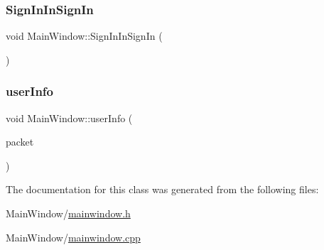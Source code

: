 \subsubsection{\texorpdfstring{Sign\+In\+In\+Sign\+In}{SignInInSignIn}}
{\footnotesize\ttfamily void Main\+Window\+::\+Sign\+In\+In\+Sign\+In (\begin{DoxyParamCaption}{ }\end{DoxyParamCaption})\hspace{0.3cm}{\ttfamily [slot]}}

\mbox{\label{classMainWindow_a2acb29717b28598ed004b381d0c5cb8a}} 
\subsubsection{\texorpdfstring{user\+Info}{userInfo}}
{\footnotesize\ttfamily void Main\+Window\+::user\+Info (\begin{DoxyParamCaption}\item[{I\+Packet \&}]{packet }\end{DoxyParamCaption})\hspace{0.3cm}{\ttfamily [slot]}}



The documentation for this class was generated from the following files\+:\begin{DoxyCompactItemize}
\item 
Main\+Window/\mbox{\hyperlink{mainwindow_8h}{mainwindow.\+h}}\item 
Main\+Window/\mbox{\hyperlink{mainwindow_8cpp}{mainwindow.\+cpp}}\end{DoxyCompactItemize}
